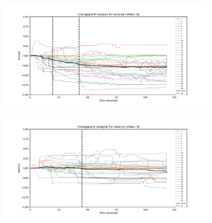\documentclass[11pt, letterpaper]{article}
\begin{document}
\begin{figure}
        \centering
    \begin{subfigure}[t]{0.49\textwidth}
        \centering
        \includegraphics[width=\linewidth]{changepoints_V3_arousal_avg_all_data} 
        \caption{} \label{fig:changepoints_V3_arousal_avg_all_data}
    \end{subfigure}
    \hfill
    \begin{subfigure}[t]{0.49\textwidth}
        \centering
        \includegraphics[width=\linewidth]{changepoints_V3_valence_avg_all_data} 
        \caption{} \label{fig:changepoints_V3_valence_avg_all_data}
    \end{subfigure}

    \vspace{1cm}
    

\end{figure}
\end{document}
